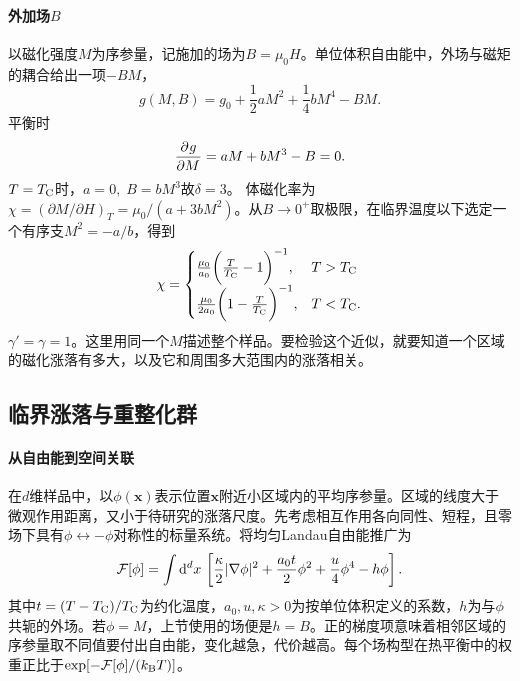 \paragraph{外加场$B$}
以磁化强度$M$为序参量，记施加的场为$B = \mu_0H$。单位体积自由能中，外场与磁矩的耦合给出一项$-BM$，
\begin{equation}
	\label{eq:sm-landau-free-energy-field}
	g(M,B) = g_0 + \frac12aM^2 + \frac14bM^4 - BM.
\end{equation}
平衡时
\begin{equation}
	\label{eq:sm-landau-equation-of-state}
	\frac{\partial^{}g}{\partial{M}^{}} = aM + bM^3 - B = 0.
\end{equation}
$T = T_\mathrm C$时，$a = 0,\;B = bM^3$故$\delta = 3$。
体磁化率为$\chi = (\partial M/\partial H)_T = \mu_0/(a + 3bM^2)$。从$B \to 0^+$取极限，在临界温度以下选定一个有序支$M^2 = -a/b$，得到
\begin{equation}
	\label{eq:sm-mean-field-susceptibility}
	\chi =
	\begin{cases}
		\frac{\mu_0}{a_0}\biggl(\frac T{T_\mathrm C} - 1\biggr)^{-1},&T > T_\mathrm C \\
		\frac{\mu_0}{2a_0}\biggl(1 - \frac T{T_\mathrm C}\biggr)^{-1}, & T < T_\mathrm C .
	\end{cases}
\end{equation}
$\gamma' = \gamma = 1$。这里用同一个$M$描述整个样品。要检验这个近似，就要知道一个区域的磁化涨落有多大，以及它和周围多大范围内的涨落相关。

\subsection{临界涨落与重整化群}
\label{sec:critical-fluctuations}

\paragraph{从自由能到空间关联}
在$d$维样品中，以$\phi(\bm x)$表示位置$\bm x$附近小区域内的平均序参量。区域的线度大于微观作用距离，又小于待研究的涨落尺度。先考虑相互作用各向同性、短程，且零场下具有$\phi \leftrightarrow -\phi$对称性的标量系统。将均匀Landau自由能推广为
\begin{equation}
    \mathcal F[\phi] = \int\mathop{}\!\mathrm{d}^d x\,
    \left[\frac{\kappa}{2}|\nabla\phi|^2 +
    \frac{a_0t}{2}\phi^2 + \frac{u}{4}\phi^4 - h\phi\right].
	\label{eq:sm-landau-ginzburg}
\end{equation}
其中$t = (T - T_\mathrm C)/T_\mathrm C$为约化温度，$a_0,u,\kappa > 0$为按单位体积定义的系数，$h$为与$\phi$共轭的外场。若$\phi = M$，上节使用的场便是$h = B$。正的梯度项意味着相邻区域的序参量取不同值要付出自由能，变化越急，代价越高。每个场构型在热平衡中的权重正比于$\exp[-\mathcal F[\phi]/(k_{\mathrm{B}} T)]$。

